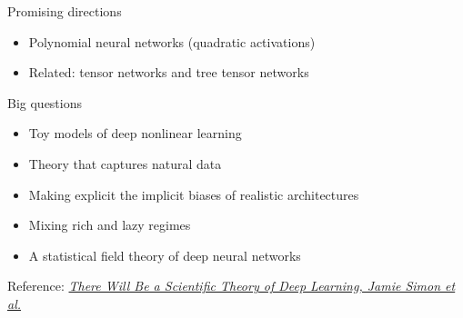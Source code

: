 \documentclass[aspectratio=169,11pt]{beamer}
\begin{document}
\begin{frame}{Promising directions}
\begin{itemize}
    \item Polynomial neural networks (quadratic activations)
    \item Related: tensor networks and tree tensor networks
\end{itemize}
\begin{block}{Big questions}
\begin{itemize}
  \item Toy models of deep nonlinear learning
  \item Theory that captures natural data
  \item Making explicit the implicit biases of realistic architectures
  \item Mixing rich and lazy regimes
  \item A statistical field theory of deep neural networks
\end{itemize}
\end{block}
Reference: \href{https://arxiv.org/abs/2604.21691}{\textit{There Will Be a Scientific Theory of Deep Learning, Jamie Simon et al.} }
\end{frame}
\end{document}

